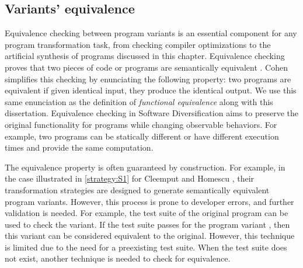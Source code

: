 \subsection{Variants' equivalence}

Equivalence checking between program variants is an essential component for any program transformation task, from checking compiler optimizations \cite{LeCompilers} to the artificial synthesis of programs discussed in this chapter. 
Equivalence checking proves that two pieces of code or programs are semantically equivalent \cite{churchill2019}. %
Cohen \cite{cohen1993operating} simplifies this checking by enunciating the following property: two programs are equivalent if given identical input, they produce the identical output. We use this same enunciation as the definition of \emph{functional equivalence} along with this dissertation. 
Equivalence checking in Software Diversification aims to preserve the original functionality for programs while changing observable behaviors. For example, two programs can be statically different or have different execution times and provide the same computation. 








The equivalence property is often guaranteed by construction. For example, in the case illustrated in \autoref{strategy:S1} for Cleemput \etal \cite{Cleemput2012} and Homescu \etal \cite{homescu2013profile}, their transformation strategies are designed to generate semantically equivalent program variants. However, this process is prone to developer errors, and further validation is needed. For example, the test suite of the original program can be used to check the variant. If the test suite passes for the program variant \cite{harrand2020java}, then this variant can be considered equivalent to the original. However, this technique is limited due to the need for a preexisting test suite. When the test suite does not exist, another technique is needed to check for equivalence.


